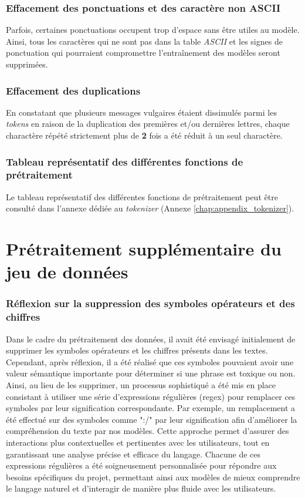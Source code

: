 \subsubsection*{Effacement des ponctuations et des caractère non ASCII}

Parfois, certaines ponctuations occupent trop d'espace sans être utiles au modèle. Ainsi, tous les caractères qui ne sont pas dans la table \textit{ASCII} et les signes de ponctuation qui pourraient compromettre l'entraînement des modèles seront supprimées.

\subsubsection*{Effacement des duplications}
En constatant que plusieurs messages vulgaires étaient dissimulés parmi les \textit{tokens} en raison de la duplication des premières et/ou dernières lettres, chaque charactère répété strictement plus de \textbf{2} fois a été réduit à un seul charactère.

\subsubsection*{Tableau représentatif des différentes fonctions de prétraitement}
Le tableau représentatif des différentes fonctions de prétraitement peut être consulté dans l'annexe dédiée au \textit{tokenizer} (Annexe \ref{chap:appendix_tokenizer}).

\section{Prétraitement supplémentaire du jeu de données}

\subsubsection*{Réflexion sur la suppression des symboles opérateurs et des chiffres}

Dans le cadre du prétraitement des données, il avait été envisagé initialement de supprimer les symboles opérateurs et les chiffres présents dans les textes. Cependant, après réflexion, il a été réalisé que ces symboles pouvaient avoir une valeur sémantique importante pour déterminer si une phrase est toxique ou non. Ainsi, au lieu de les supprimer, un processus sophistiqué a été mis en place consistant à utiliser une série d'expressions régulières (regex) pour remplacer ces symboles par leur signification correspondante.
Par exemple, un remplacement a été effectué sur des symboles comme ":/" par leur signification afin d'améliorer la compréhension du texte par nos modèles.
Cette approche permet d'assurer des interactions plus contextuelles et pertinentes avec les utilisateurs, tout en garantissant une analyse précise et efficace du langage.
Chacune de ces expressions régulières a été soigneusement personnalisée pour répondre aux besoins spécifiques du projet, permettant ainsi aux modèles de mieux comprendre le langage naturel et d'interagir de manière plus fluide avec les utilisateurs.

